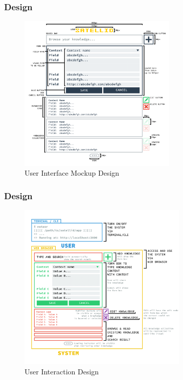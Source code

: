 \documentclass[10pt, compress]{beamer}
\begin{document}
\begin{frame}[fragile]
  \frametitle{Design}

  \begin{figure}[ht]
    \centering
    \vspace{-25pt}
    \includegraphics[height=7.5cm]{include/satellid-app-ui.png}
    \caption{User Interface Mockup Design}
    \vspace{-20pt}
    \label{fig:satellid-ui}
  \end{figure}

\end{frame}


\begin{frame}[fragile]
  \frametitle{Design}

  \begin{figure}[ht]
    \centering
    \vspace{-25pt}
    \includegraphics[width=8cm]{include/satellid-app-uix.png}
    \vspace{-20pt}
    \caption{User Interaction Design}
    \label{fig:satellid-uix}
  \end{figure}

\end{frame}
\end{document}
